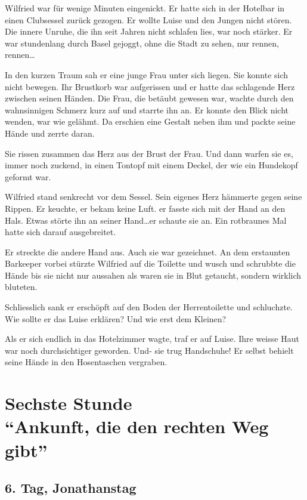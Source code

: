 \documentclass[11pt,titlepage,a5paper]{book}
\begin{document}
Wilfried war für wenige Minuten eingenickt. Er hatte sich in der Hotelbar in einen Clubsessel zurück gezogen. Er wollte Luise und den Jungen nicht stören. Die innere Unruhe, die ihn seit Jahren nicht schlafen lies, war noch stärker. Er war stundenlang durch Basel gejoggt, ohne die Stadt zu sehen, nur rennen, rennen\dots

In den kurzen Traum sah er eine junge Frau unter sich liegen. Sie konnte sich nicht bewegen. Ihr Brustkorb war aufgerissen und er hatte das schlagende Herz zwischen seinen Händen. Die Frau, die betäubt gewesen war, wachte durch den wahnsinnigen Schmerz kurz auf und starrte ihn an. Er konnte den Blick nicht wenden, war wie gelähmt. Da erschien eine Gestalt neben ihm und packte seine Hände und zerrte daran. 

Sie rissen zusammen das Herz aus der Brust der Frau. Und dann warfen sie es, immer noch zuckend, in einen Tontopf mit einem Deckel, der wie ein Hundekopf geformt war.

Wilfried stand senkrecht vor dem Sessel. Sein eigenes Herz hämmerte gegen seine Rippen. Er keuchte, er bekam keine Luft. er fasste sich mit der Hand an den Hals. Etwas störte ihn an seiner Hand\dots er schaute sie an. Ein rotbraunes Mal hatte sich darauf ausgebreitet. 

Er streckte die andere Hand aus. Auch sie war gezeichnet. An dem erstaunten Barkeeper vorbei stürzte Wilfried auf die Toilette und wusch und schrubbte die Hände bis sie nicht nur aussahen als waren sie in Blut getaucht, sondern wirklich bluteten. 


Schliesslich sank er erschöpft auf den Boden der Herrentoilette und schluchzte. Wie sollte er das Luise erklären? Und wie erst dem Kleinen?

Als er sich endlich in das Hotelzimmer wagte, traf er auf Luise. Ihre weisse Haut war noch durchsichtiger geworden. Und- sie trug Handschuhe! Er selbst behielt seine Hände in den Hosentaschen vergraben.


\part*{Sechste Stunde\\"`Ankunft, die den rechten Weg gibt"'}

\chapter*{6. Tag, Jonathanstag}
\end{document}
